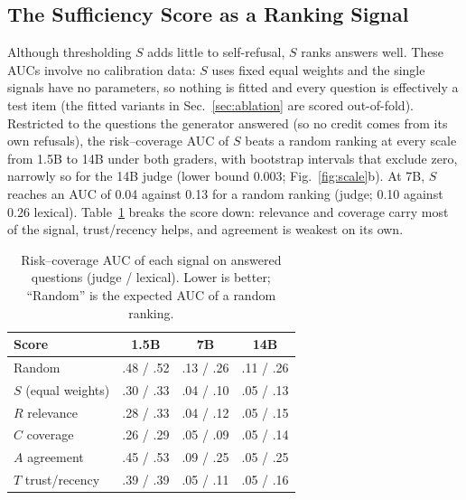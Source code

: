 \documentclass[conference,letterpaper]{IEEEtran}
\begin{document}
\subsection{The Sufficiency Score as a Ranking Signal}\label{sec:ranking}
Although thresholding $S$ adds little to self-refusal, $S$ ranks answers well. These AUCs involve
no calibration data: $S$ uses fixed equal weights and the single signals have no parameters, so
nothing is fitted and every question is effectively a test item (the fitted variants in Sec.~\ref{sec:ablation} are
scored out-of-fold). Restricted to the
questions the generator answered (so no credit comes from its own refusals), the risk--coverage
AUC of $S$ beats a random ranking at every scale from 1.5B to 14B under both graders, with
bootstrap intervals that exclude zero, narrowly so for the 14B judge (lower bound 0.003;
Fig.~\ref{fig:scale}b). At 7B, $S$ reaches an AUC of 0.04 against 0.13 for a random ranking
(judge; 0.10 against 0.26 lexical). Table~\ref{tab:signals} breaks the score down: relevance and
coverage carry most of the signal, trust/recency helps, and agreement is weakest on its own.

\begin{table}[t]
\caption{Risk--coverage AUC of each signal on answered questions (judge / lexical). Lower is
better; ``Random'' is the expected AUC of a random ranking.}
\label{tab:signals}
\centering
\setlength{\tabcolsep}{4pt}
\begin{tabular}{lccc}
\toprule
Score & 1.5B & 7B & 14B\\
\midrule
Random            & .48 / .52 & .13 / .26 & .11 / .26\\
$S$ (equal weights) & .30 / .33 & .04 / .10 & .05 / .13\\
$R$ relevance     & .28 / .33 & .04 / .12 & .05 / .15\\
$C$ coverage      & .26 / .29 & .05 / .09 & .05 / .14\\
$A$ agreement     & .45 / .53 & .09 / .25 & .05 / .25\\
$T$ trust/recency & .39 / .39 & .05 / .11 & .05 / .16\\
\bottomrule
\end{tabular}
\end{table}
\end{document}
